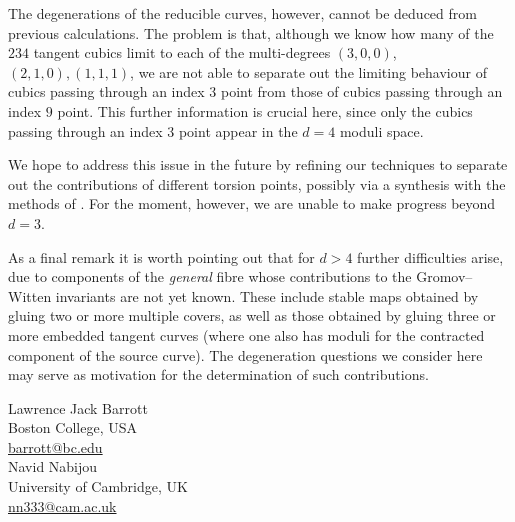 \documentclass[11pt]{amsart}
\theoremstyle{definition}
\theoremstyle{definition}
\begin{document}
The degenerations of the reducible curves, however, cannot be deduced from previous calculations. The problem is that, although we know how many of the $234$ tangent cubics limit to each of the multi-degrees $(3,0,0)$,$(2,1,0),(1,1,1)$, we are not able to separate out the limiting behaviour of cubics passing through an index $3$ point from those of cubics passing through an index $9$ point. This further information is crucial here, since only the cubics passing through an index $3$ point appear in the $d=4$ moduli space.

We hope to address this issue in the future by refining our techniques to separate out the contributions of different torsion points, possibly via a synthesis with the methods of \cite{Graefnitz}. For the moment, however, we are unable to make progress beyond $d=3$.

As a final remark it is worth pointing out that for $d > 4$ further difficulties arise, due to components of the \emph{general} fibre whose contributions to the Gromov--Witten invariants are not yet known. These include stable maps obtained by gluing two or more multiple covers, as well as those obtained by gluing three or more embedded tangent curves (where one also has moduli for the contracted component of the source curve). The degeneration questions we consider here may serve as motivation for the determination of such contributions.

\footnotesize



\bigskip\bigskip

\noindent Lawrence Jack Barrott \\
Boston College, USA \\
\href{mailto:barrott@bc.edu}{barrott@bc.edu}\\

\noindent Navid Nabijou \\
University of Cambridge, UK \\
\href{mailto:nn333@cam.ac.uk}{nn333@cam.ac.uk}
\end{document}
